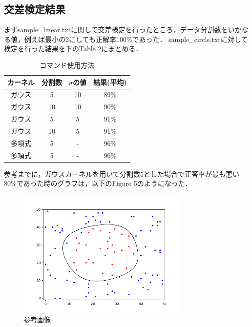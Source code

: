 \documentclass[11pt]{article}
\begin{document}
\subsection{交差検定結果}
まずsample\_linear.txtに関して交差検定を行ったところ，データ分割数をいかなる値，例えば最小の2にしても正解率100\%であった．
sample\_circle.txtに対して検定を行った結果を下のTable 2にまとめる．\\

\begin{table}[htb]
    \begin{center}
        \caption{コマンド使用方法}
        \begin{tabular}{|c|c|c|c|} \hline
        カーネル & 分割数 & $\sigma$の値 & 結果(平均) \\ \hline \hline
        ガウス & 5 & 10 & 89\% \\ \hline
        ガウス & 10 & 10 & 90\% \\ \hline
        ガウス & 5 & 5 & 91\% \\ \hline
        ガウス & 10 & 5 & 91\% \\ \hline
        多項式 & 5 & - & 96\% \\ \hline
        多項式 & 5 & - & 96\% \\ \hline
        \end{tabular}
    \end{center}
\end{table}
参考までに，ガウスカーネルを用いて分割数5とした場合で正答率が最も悪い80\%であった時のグラフは，以下のFigure 5のようになった．

\begin{figure}[htbp]
    \begin{center}
        \caption{参考画像}
        \includegraphics[width=8.5cm]{../results/gaussian_sigma=10_2703_accuracy=0_8.png}
    \end{center}
\end{figure}
\end{document}
